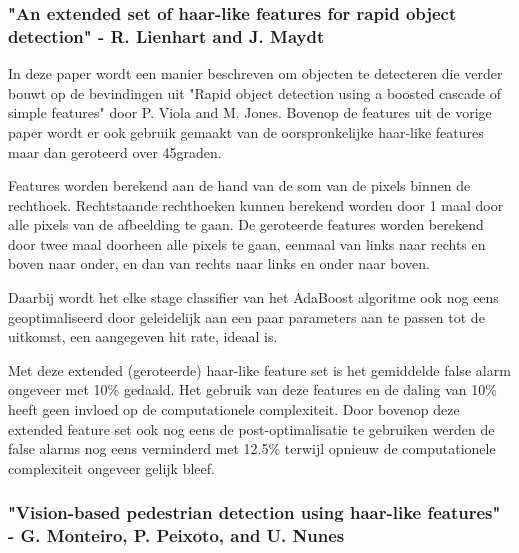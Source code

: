 \documentclass[]{article}
\begin{document}
\subsubsection*{"An extended set of haar-like features for rapid object detection" - R. Lienhart and J. Maydt}
In deze paper wordt een manier beschreven om objecten te detecteren die verder bouwt op de bevindingen uit "Rapid object detection using a boosted cascade of simple features" door P. Viola and M. Jones. Bovenop de features uit de vorige paper wordt er ook gebruik gemaakt van de oorspronkelijke haar-like features maar dan geroteerd over 45graden.
\par
Features worden berekend aan de hand van de som van de pixels binnen de rechthoek. Rechtstaande rechthoeken kunnen berekend worden door 1 maal door alle pixels van de afbeelding te gaan. De geroteerde features worden berekend door twee maal doorheen alle pixels te gaan, eenmaal van links naar rechts en boven naar onder, en dan van rechts naar links en onder naar boven.
\par
Daarbij wordt het elke stage classifier van het AdaBoost algoritme ook nog eens geoptimaliseerd door geleidelijk aan een paar parameters aan te passen tot de uitkomst, een aangegeven hit rate, ideaal is.
\par
Met deze extended (geroteerde) haar-like feature set is het gemiddelde false alarm ongeveer met 10\% gedaald. Het gebruik van deze features en de daling van 10\% heeft geen invloed op de computationele complexiteit. Door bovenop deze extended feature set ook nog eens de post-optimalisatie te gebruiken werden de false alarms nog eens verminderd met 12.5\% terwijl opnieuw de computationele complexiteit ongeveer gelijk bleef.
\subsubsection*{"Vision-based pedestrian detection using haar-like features" - G. Monteiro, P. Peixoto, and U. Nunes}
\end{document}
